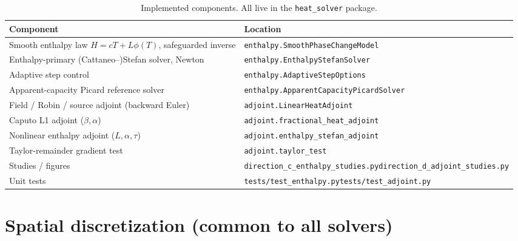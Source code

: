 \documentclass[11pt]{article}
\numberwithin{equation}{section}
\theoremstyle{remark}
\begin{document}
\begin{table}[h]
\centering
\caption{Implemented components.  All live in the \texttt{heat\_solver} package.}
\label{tab:components}
\small
\begin{tabular}{@{}p{}p{}@{}}
\toprule
Component & Location \\
\midrule
Smooth enthalpy law $H=cT+L\phi(T)$, safeguarded inverse & \texttt{enthalpy.SmoothPhaseChangeModel} \\
Enthalpy-primary (Cattaneo--)Stefan solver, Newton & \texttt{enthalpy.EnthalpyStefanSolver} \\
Adaptive step control & \texttt{enthalpy.AdaptiveStepOptions} \\
Apparent-capacity Picard reference solver & \texttt{enthalpy.ApparentCapacityPicardSolver} \\
Field / Robin / source adjoint (backward Euler) & \texttt{adjoint.LinearHeatAdjoint} \\
Caputo L1 adjoint ($\beta,\alpha$) & \texttt{adjoint.fractional\_heat\_adjoint} \\
Nonlinear enthalpy adjoint ($L,\alpha,\tau$) & \texttt{adjoint.enthalpy\_stefan\_adjoint} \\
Taylor-remainder gradient test & \texttt{adjoint.taylor\_test} \\
Studies / figures & \texttt{direction\_c\_enthalpy\_studies.py}\newline \texttt{direction\_d\_adjoint\_studies.py} \\
Unit tests & \texttt{tests/test\_enthalpy.py}\newline \texttt{tests/test\_adjoint.py} \\
\bottomrule
\end{tabular}
\end{table}

\section{Spatial discretization (common to all solvers)}
\end{document}
